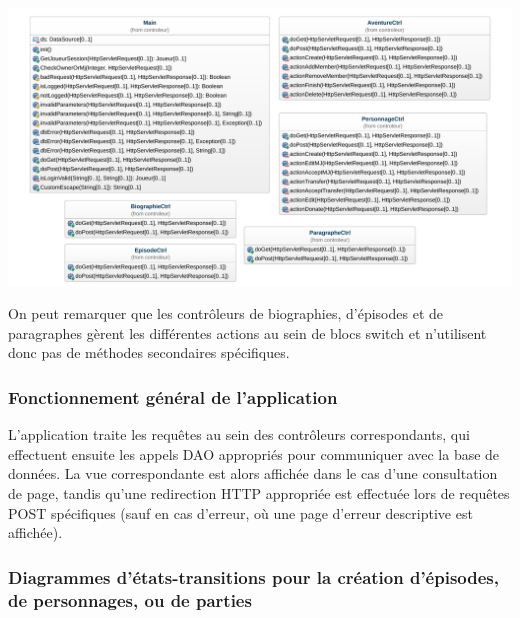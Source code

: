 \documentclass[a4paper, 11pt, titlepage]{article}
\begin{document}
\begin{center}
\includegraphics[scale=0.55]{conception/ctrl.pdf}
\end{center}

On peut remarquer que les contrôleurs de biographies, d'épisodes et de paragraphes gèrent les différentes actions au sein de blocs switch et n'utilisent donc pas de méthodes secondaires spécifiques.


\subsubsection {Fonctionnement général de l'application}

L'application traite les requêtes au sein des contrôleurs correspondants, qui effectuent ensuite les appels DAO appropriés pour communiquer avec la base de données. La vue correspondante est alors affichée dans le cas d'une consultation de page, tandis qu'une redirection HTTP appropriée est effectuée lors de requêtes POST spécifiques (sauf en cas d'erreur, o\`u une page d'erreur descriptive est affichée).


\subsubsection {Diagrammes d'états-transitions pour la création d'épisodes, de personnages, ou de parties}
\end{document}
